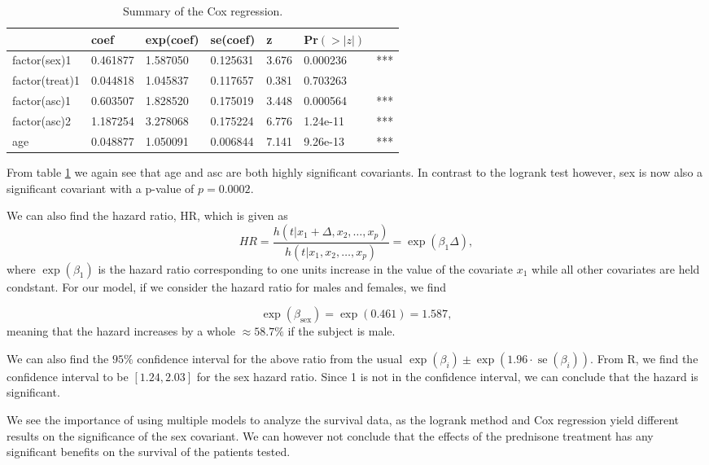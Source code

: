 \documentclass[a4paper, 10pt, reqno]{amsart}
\begin{document}
\begin{table}
\caption{Summary of the Cox regression.}
\label{tab: cox}
\begin{tabular}{lllllll}
\hline\hline
            &       coef& exp(coef)& se(coef) &    z &Pr$(>|z|)$ & \\ \hline  
factor(sex)1 &  0.461877 & 1.587050& 0.125631& 3.676& 0.000236 &***\\
factor(treat)1 &0.044818  &1.045837 &0.117657 &0.381 &0.703263 &   \\
factor(asc)1 &  0.603507&  1.828520& 0.175019& 3.448 &0.000564 &***\\
factor(asc)2  & 1.187254 & 3.278068 &0.175224& 6.776& 1.24e-11 &***\\
age      &      0.048877 & 1.050091 &0.006844 &7.141 &9.26e-13 &***\\
\hline
\end{tabular}
\end{table}
From table \ref{tab: cox} we again see that age and asc are both highly significant covariants. In contrast to the logrank test however, sex is now also a significant covariant with a p-value of $p=0.0002$.

We can also find the hazard ratio, HR, which is given as
\begin{equation}
    HR = \frac{h\left(t | x_{1}+\Delta, x_{2}, \ldots, x_{p}\right)}{h\left(t | x_{1}, x_{2}, \ldots, x_{p}\right)}=\exp \left(\beta_{1} \Delta\right),
\end{equation}
where $\exp(\beta_1)$ is the hazard ratio corresponding to one units increase in the value of the covariate $x_1$ while all other covariates are held condstant. For our model, if we consider the hazard ratio for males and females, we find

\begin{equation}
    \exp \left(\beta_{\text {sex}}\right)=\exp (0.461)=1.587,
\end{equation}
meaning that the hazard increases by a whole $\approx 58.7\%$ if the subject is male. 

We can also find the $95\%$ confidence interval for the above ratio from the usual $\exp \left(\beta_{i}\right) \pm \exp \left(1.96 \cdot \operatorname{se}\left(\beta_{i}\right)\right)$. From R, we find the confidence interval to be $[1.24, 2.03]$ for the sex hazard ratio. Since 1 is not in the confidence interval, we can conclude that the hazard is significant.

We see the importance of using multiple models to analyze the survival data, as the logrank method and Cox regression yield different results on the significance of the sex covariant. We can however not conclude that the effects of the prednisone treatment has any significant benefits on the survival of the patients tested.
\end{document}
